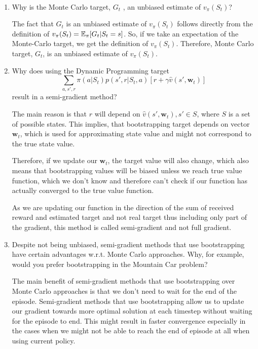 \documentclass{exam}
\begin{document}
\begin{problem}
\ \newline
\begin{enumerate}
    \item Why is the Monte Carlo target, $G_t$ , an unbiased estimate of $v_{\pi}(S_t)$?
    \begin{solutionorlines}[2in]
    The fact that $G_t$ is an unbiased estimate of $v_{\pi}(S_t)$ follows directly from the definition of $v_{\pi}(S_t) = \operatorname*{\mathbb{E}}_{\pi}[G_t| S_t=s]$. So, if we take an expectation of the Monte-Carlo target, we get the definition of $v_{\pi}(S_t)$. Therefore, Monte Carlo target, $G_t$, is an unbiased estimate of $v_{\pi}(S_t)$.
    \end{solutionorlines}
    \item Why does using the Dynamic Programming target
    \begin{equation}
        \sum_{a, s',  r} \pi(a|S_t) p(s',r|S_t,a)[r + \gamma \hat{v}(s',\mathbf{w}_t)]
    \end{equation}
    result in a semi-gradient method?
    \begin{solutionorlines}[2in]
    The main reason is that $r$ will depend on $\hat{v}(s',\mathbf{w}_t), s' \in S$, where $S$ is a set of possible states. This implies, that bootstrapping target depends on vector $\mathbf{w}_t$, which is used for approximating state value and might not correspond to the true state value. 
    
    Therefore, if we update our $\mathbf{w}_t$, the target value will also change, which also means that bootstrapping values will be biased unless we reach true value function, which we don't know and therefore can't check if our function has actually converged to the true value function.
    
    As we are updating our function in the direction of the sum of received reward and estimated target and not real target thus including only part of the gradient, this method is called semi-gradient and not full gradient.
    \end{solutionorlines}
    \item Despite not being unbiased, semi-gradient methods that use bootstrapping have certain advantages w.r.t. Monte Carlo approaches. Why, for example, would you prefer bootstrapping in the Mountain Car problem?
    \begin{solutionorlines}[2in]
    The main benefit of semi-gradient methods that use bootstrapping over Monte Carlo approaches is that we don't need to wait for the end of the episode. Semi-gradient methods that use bootstrapping allow us to update our gradient towards more optimal solution at each timestep without waiting for the episode to end. This might result in faster convergence especially in the cases when we might not be able to reach the end of episode at all when using current policy.
    

\end{solutionorlines}
\end{enumerate}
\end{problem}
\end{document}
